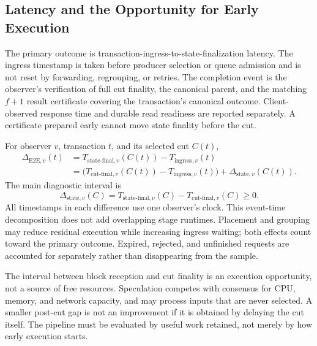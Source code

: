 

\subsection{Latency and the Opportunity for Early Execution}

The primary outcome is transaction-ingress-to-state-finalization latency. The ingress timestamp is taken before producer selection or queue admission and is not reset by forwarding, regrouping, or retries. The completion event is the observer's verification of full cut finality, the canonical parent, and the matching \(f+1\) result certificate covering the transaction's canonical outcome. Client-observed response time and durable read readiness are reported separately. A certificate prepared early cannot move state finality before the cut.

For observer \(v\), transaction \(t\), and its selected cut \(C(t)\),
\begin{equation}
\begin{aligned}
  \Delta_{\mathrm{E2E},v}(t)
  & = T_{\mathrm{state\text{-}final},v}(C(t))-T_{\mathrm{ingress},v}(t) \\
  & = \bigl(T_{\mathrm{cut\text{-}final},v}(C(t))-T_{\mathrm{ingress},v}(t)\bigr)
      +\Delta_{\mathrm{state},v}(C(t)).
\end{aligned}
\label{eq:e2e-latency}
\end{equation}
The main diagnostic interval is
\begin{equation}
  \Delta_{\mathrm{state},v}(C)
  = T_{\mathrm{state\text{-}final},v}(C)
    - T_{\mathrm{cut\text{-}final},v}(C) \geq 0.
  \label{eq:latency}
\end{equation}
All timestamps in each difference use one observer's clock. This event-time decomposition does not add overlapping stage runtimes. Placement and grouping may reduce residual execution while increasing ingress waiting; both effects count toward the primary outcome. Expired, rejected, and unfinished requests are accounted for separately rather than disappearing from the sample.

The interval between block reception and cut finality is an execution opportunity, not a source of free resources. Speculation competes with consensus for CPU, memory, and network capacity, and may process inputs that are never selected. A smaller post-cut gap is not an improvement if it is obtained by delaying the cut itself. The pipeline must be evaluated by useful work retained, not merely by how early execution starts.
